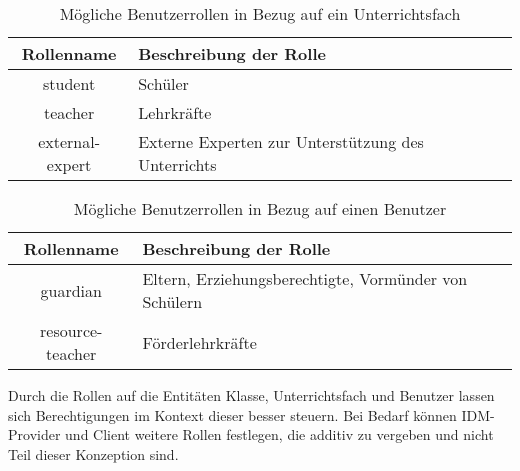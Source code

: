 \begin{table}[htb]
	\begin{tabularx}{\textwidth}{|c|X|}
		\hline
\textbf{Rollenname} & \textbf{Beschreibung der Rolle} \\ \hline
student & Schüler \\ \hline
teacher & Lehrkräfte \\ \hline
external-expert & Externe Experten zur Unterstützung des Unterrichts \\ \hline
	\end{tabularx}

		\caption{Mögliche Benutzerrollen in Bezug auf ein Unterrichtsfach}
		\label{tab:intro:rolessubject}
\end{table}

\begin{table}[htb]
	\begin{tabularx}{\textwidth}{|c|X|}
		\hline
\textbf{Rollenname} & \textbf{Beschreibung der Rolle} \\ \hline
guardian & Eltern, Erziehungsberechtigte, Vormünder von Schülern \\ \hline
resource-teacher & Förderlehrkräfte \\ \hline
	\end{tabularx}

		\caption{Mögliche Benutzerrollen in Bezug auf einen Benutzer}
		\label{tab:intro:rolesuser}
\end{table}


Durch die Rollen auf die Entitäten Klasse, Unterrichtsfach und Benutzer lassen sich Berechtigungen im Kontext dieser besser steuern. Bei Bedarf können IDM-Provider und Client weitere Rollen festlegen, die additiv zu vergeben und nicht Teil dieser Konzeption sind.
